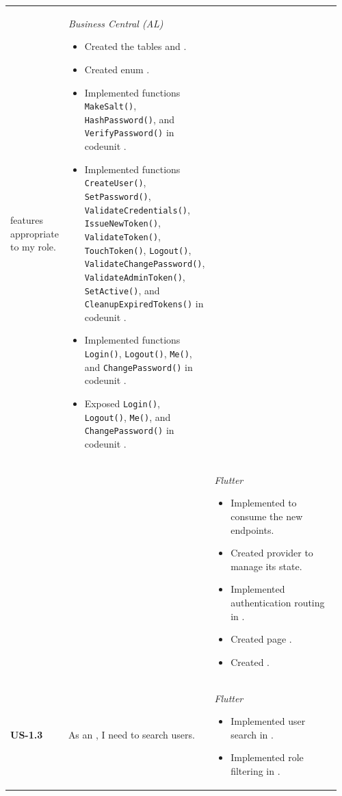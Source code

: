 \begin{longtable}{@{} P{0.09\linewidth} P{0.34\linewidth} P{0.53\linewidth} @{}}
	features appropriate to my role.
	& \noindent\textit{Business Central (AL)}
	\begin{itemize}[noitemsep, topsep=0pt, partopsep=0pt, leftmargin=*]
		\item Created the tables  and .
		\item Created enum .
		\item Implemented functions \texttt{MakeSalt()}, \texttt{HashPassword()}, and \texttt{VerifyPassword()} in codeunit .
		\item Implemented functions \texttt{CreateUser()}, \texttt{SetPassword()}, \texttt{ValidateCredentials()}, \texttt{IssueNewToken()}, \texttt{ValidateToken()}, \texttt{TouchToken()}, \texttt{Logout()}, \texttt{ValidateChangePassword()}, \texttt{ValidateAdminToken()}, \texttt{SetActive()}, and \texttt{CleanupExpiredTokens()} in codeunit .
		\item Implemented functions \texttt{Login()}, \texttt{Logout()}, \texttt{Me()}, and \texttt{ChangePassword()} in codeunit .
		\item Exposed \texttt{Login()}, \texttt{Logout()}, \texttt{Me()}, and \texttt{ChangePassword()} in codeunit .
	\end{itemize}
\\ & &
	\noindent\textit{Flutter}
	\begin{itemize}[noitemsep, topsep=0pt, partopsep=0pt, leftmargin=*]
		\item Implemented  to consume the new endpoints.
		\item Created provider  to manage its state.
		\item Implemented authentication routing in .
		\item Created page .
		\item Created .
	\end{itemize}\\
	\midrule
	\textbf{US-1.3}
	& As an , I need to search users.
	& \noindent\textit{Flutter}
	\begin{itemize}[noitemsep, topsep=0pt, partopsep=0pt, leftmargin=*]
		\item Implemented user search in .
		\item Implemented role filtering in .

\end{itemize}
\end{longtable}
